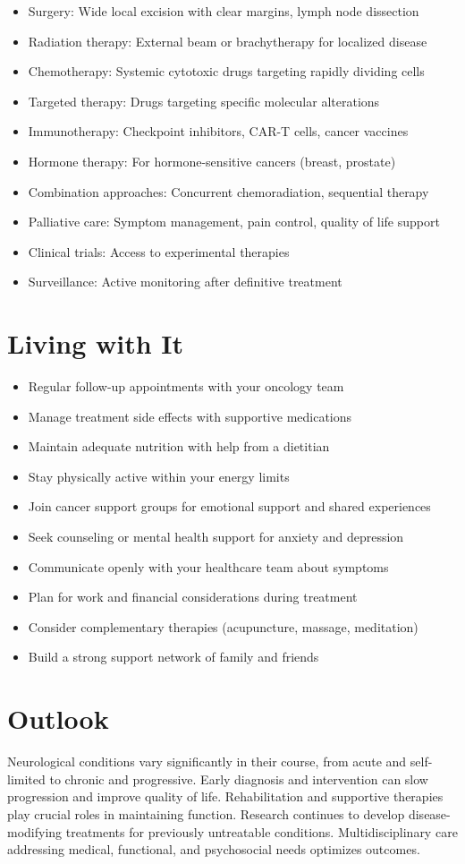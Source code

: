 \begin{itemize}[noitemsep]
  \item Surgery: Wide local excision with clear margins, lymph node dissection
  \item Radiation therapy: External beam or brachytherapy for localized disease
  \item Chemotherapy: Systemic cytotoxic drugs targeting rapidly dividing cells
  \item Targeted therapy: Drugs targeting specific molecular alterations
  \item Immunotherapy: Checkpoint inhibitors, CAR-T cells, cancer vaccines
  \item Hormone therapy: For hormone-sensitive cancers (breast, prostate)
  \item Combination approaches: Concurrent chemoradiation, sequential therapy
  \item Palliative care: Symptom management, pain control, quality of life support
  \item Clinical trials: Access to experimental therapies
  \item Surveillance: Active monitoring after definitive treatment
\end{itemize}
\section{Living with It}
\begin{itemize}[noitemsep]
  \item Regular follow-up appointments with your oncology team
  \item Manage treatment side effects with supportive medications
  \item Maintain adequate nutrition with help from a dietitian
  \item Stay physically active within your energy limits
  \item Join cancer support groups for emotional support and shared experiences
  \item Seek counseling or mental health support for anxiety and depression
  \item Communicate openly with your healthcare team about symptoms
  \item Plan for work and financial considerations during treatment
  \item Consider complementary therapies (acupuncture, massage, meditation)
  \item Build a strong support network of family and friends
\end{itemize}
\section{Outlook}
Neurological conditions vary significantly in their course, from acute and self-limited to chronic and progressive. Early diagnosis and intervention can slow progression and improve quality of life. Rehabilitation and supportive therapies play crucial roles in maintaining function. Research continues to develop disease-modifying treatments for previously untreatable conditions. Multidisciplinary care addressing medical, functional, and psychosocial needs optimizes outcomes.

